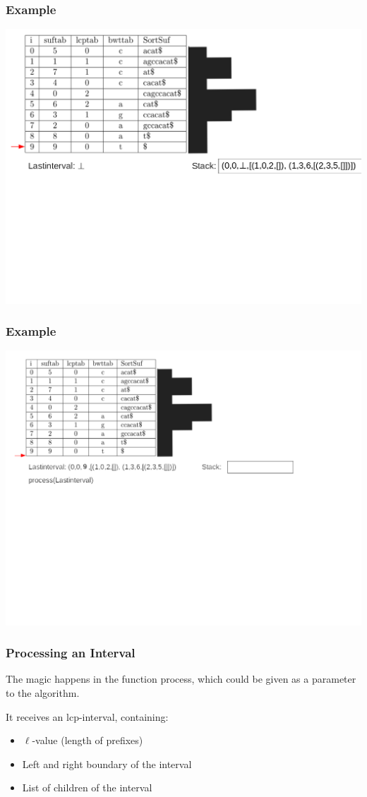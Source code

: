 \documentclass[compress,handout]{beamer} %
\begin{document}
\begin{frame}
	\frametitle{Example}
	\includegraphics[width=\textwidth, height=\textheight, keepaspectratio=true]{traversal_14}
\end{frame}

\begin{frame}
	\frametitle{Example}
	\includegraphics[width=\textwidth, height=\textheight, keepaspectratio=true]{traversal_15}
\end{frame}

\begin{frame}
	\frametitle{Processing an Interval}
	The magic happens in the function process, which could be given
	as a parameter to the algorithm.

	It receives an lcp-interval, containing:
	\begin{itemize}
		\item $\ell$-value (length of prefixes)
		\item Left and right boundary of the interval
		\item List of children of the interval
	\end{itemize}
\end{frame}
\end{document}
